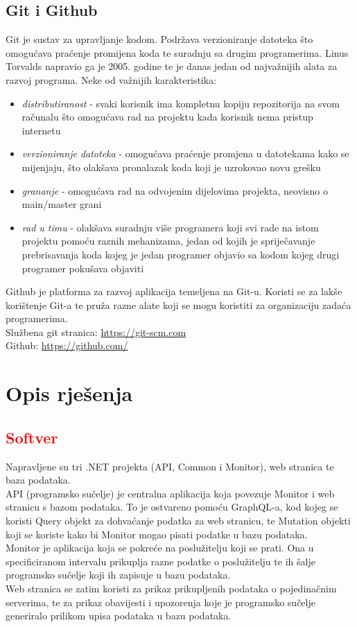 \documentclass[zavrsnirad]{fer}
\begin{document}
\section{Git i Github}
Git je sustav za upravljanje kodom. Podržava verzioniranje datoteka što omogućava praćenje promijena koda te suradnju sa drugim programerima. Linus Torvalds napravio ga je 2005. godine te je danas jedan od najvažnijih alata za razvoj programa. Neke od važnijih karakteristika:
\begin{itemize}
	\item \textit{distributiranost} - svaki korisnik ima kompletnu kopiju repozitorija na svom računalu što omogućava rad na projektu kada korisnik nema pristup internetu
	\item \textit{verzioniranje datoteka} - omogućava praćenje promjena u datotekama kako se mijenjaju, što olakšava pronalazak koda koji je uzrokovao novu grešku
	\item \textit{grananje} - omogućava rad na odvojenim dijelovima projekta, neovisno o main/master grani
	\item \textit{rad u timu} - olakšava suradnju više programera koji svi rade na istom projektu pomoću raznih mehanizama, jedan od kojih je spriječavanje prebrisavanja koda kojeg je jedan programer objavio sa kodom kojeg drugi programer pokušava objaviti
\end{itemize}
Github je platforma za razvoj aplikacija temeljena na Git-u. Koristi se za lakše korištenje Git-a te pruža razne alate koji se mogu koristiti za organizaciju zadaća programerima.
\\Službena git stranica: \url{https://git-scm.com}
\\Github: \url{https://github.com/}


\chapter{Opis rješenja}
\label{pog:opis_rjesenja}
\section{\textcolor{red}{Softver}}
Napravljene su tri .NET projekta (API, Common i Monitor), web stranica te baza podataka.
\\API (programsko sučelje) je centralna aplikacija koja povezuje Monitor i web stranicu s bazom podataka. To je ostvareno pomoću GraphQL-a, kod kojeg se koristi Query objekt za dohvaćanje podatka za web stranicu, te Mutation objekti koji se koriste kako bi Monitor mogao pisati podatke u bazu podataka.
\\Monitor je aplikacija koja se pokreće na poslužitelju koji se prati. Ona u specificiranom intervalu prikuplja razne podatke o poslužitelju te ih šalje programsko sučelje koji ih zapisuje u bazu podataka.
\\Web stranica se zatim koristi za prikaz prikupljenih podataka o pojedinačnim serverima, te za prikaz obavijesti i upozorenja koje je programsko sučelje generiralo prilikom upisa podataka u bazu podataka.
\end{document}
